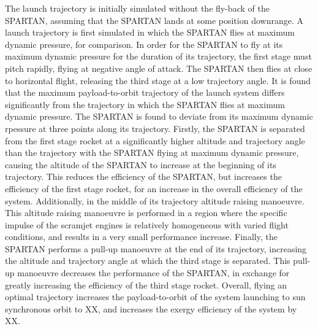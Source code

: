  The launch trajectory is initially simulated without the fly-back of the SPARTAN, assuming that the SPARTAN lands at some position downrange. A launch trajectory is first simulated in which the SPARTAN flies at maximum dynamic pressure, for comparison. In order for the SPARTAN to fly at its maximum dynamic pressure for the duration of its trajectory, the first stage must pitch rapidly, flying at negative angle of attack. The SPARTAN then flies at close to horizontal flight, releasing the third stage at a low trajectory angle. It is found that the maximum payload-to-orbit trajectory of the launch system differs significantly from the trajectory in which the SPARTAN flies at maximum dynamic pressure. 
 The SPARTAN is found to deviate from its maximum dynamic rpessure at three points along its trajectory.
 Firstly, the SPARTAN is separated from the first stage rocket at a significantly higher altitude and trajectory angle than the trajectory with the SPARTAN flying at maximum dynamic pressure, causing the altitude of the SPARTAN to increase at the beginning of its trajectory. This reduces the efficiency of the SPARTAN, but increases the efficiency of the first stage rocket, for an increase in the overall efficiency of the system. 
  Additionally, in the middle of its trajectory altitude raising manoeuvre. This altitude raising manoeuvre is performed in a region where the specific impulse of the scramjet engines is relatively homogeneous with varied flight conditions, and results in a very small performance increase. Finally, the SPARTAN performs a pull-up manoeuvre at the end of its trajectory, increasing the altitude and trajectory angle at which the third stage is separated. This pull-up manoeuvre decreases the performance of the SPARTAN, in exchange for greatly increasing the efficiency of the third stage rocket. Overall, flying an optimal trajectory increases the payload-to-orbit of the system launching to sun synchronous orbit to XX, and increases the exergy efficiency of the system by XX.  
 
